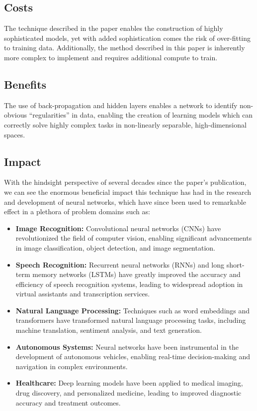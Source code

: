 \documentclass[10pt]{article}
\begin{document}
\subsection*{Costs}
The technique described in the paper enables the construction of highly sophisticated models, yet with added sophistication comes the risk of over-fitting to training data. Additionally, the method described in this paper is inherently more complex to implement and requires additional compute to train.

\subsection*{Benefits}
The use of back-propagation and hidden layers enables a network to identify non-obvious ``regularities'' in data, enabling the creation of learning models which can correctly solve highly complex tasks in non-linearly separable, high-dimensional spaces.

\subsection*{Impact}

With the hindsight perspective of several decades since the paper's publication, we can see the enormous beneficial impact this technique has had in the research and development of neural networks, which have since been used to remarkable effect in a plethora of problem domains such as:

\begin{itemize}
    \item \textbf{Image Recognition:} Convolutional neural networks (CNNs) have revolutionized the field of computer vision, enabling significant advancements in image classification, object detection, and image segmentation.
    \item \textbf{Speech Recognition:} Recurrent neural networks (RNNs) and long short-term memory networks (LSTMs) have greatly improved the accuracy and efficiency of speech recognition systems, leading to widespread adoption in virtual assistants and transcription services.
    \item \textbf{Natural Language Processing:} Techniques such as word embeddings and transformers have transformed natural language processing tasks, including machine translation, sentiment analysis, and text generation.
    \item \textbf{Autonomous Systems:} Neural networks have been instrumental in the development of autonomous vehicles, enabling real-time decision-making and navigation in complex environments.
    \item \textbf{Healthcare:} Deep learning models have been applied to medical imaging, drug discovery, and personalized medicine, leading to improved diagnostic accuracy and treatment outcomes.
\end{itemize}
\end{document}

